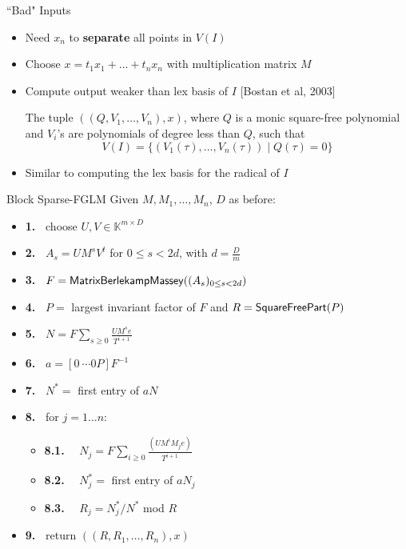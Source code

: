 \documentclass{beamer}
\begin{document}
\begin{frame}{``Bad" Inputs}
	\begin{itemize}
		\item Need $x_n$ to \textbf{separate} all points in $V(I)$
		\item Choose $x = t_1 x_1 + \dots + t_n x_n$ with multiplication matrix $M$
		\item Compute output weaker than lex basis of $I$ [Bostan et al, 2003]
		\begin{definition}
			The tuple $((Q,V_1,\dots,V_n),x)$, where $Q$ is a monic square-free
			polynomial and $V_i$'s are polynomials of degree less than $Q$, such
			that
			$$ V(I) = \{ (V_1(\tau), \dots, V_n(\tau)) \mid Q(\tau) = 0 \} $$
		\end{definition}
		\item Similar to computing the lex basis for the radical of $I$
	\end{itemize}

\end{frame}

\begin{frame}{Block Sparse-FGLM}
	Given $M,M_1,\dots,M_n$, $D$ as before:
		\begin{itemize}
			\item[]{\bf 1.~} {\sf choose $U,V \in \mathbb{K}^{m \times D}$}
			\item[]{\bf 2.~} {\sf $A_s = UM^sV^t$ for $0 \le s < 2d$, with $d = \frac{D}{m}$}
			\item[]{\bf 3.~} {\sf $F = {\sf MatrixBerlekampMassey}((A_s)_{0\le s < 2d})$}
			\item[]{\bf 4.~} {\sf $P=$ largest invariant factor of $F$ and $R={\sf SquareFreePart}(P)$}
			\item[]{\bf 5.~} {\sf $N = F\sum_{s\ge 0} \frac{UM^s e}{T^{i+1}}$}
			\item[]{\bf 6.~} {\sf $a = [0 ~\cdots 0 P] F^{-1}$}
			\item[]{\bf 7.~} {\sf $N^*=$ first entry of $aN$}
			\item[]{\bf 8.~} {\sf for $j = 1 \dots n$:}
			\begin{itemize}
				\item[]{\bf 8.1.} ~~{\sf $N_j = F\sum_{i\ge 0} \frac{(UM^i M_j e)}{T^{i+1}}$}
				\item[]{\bf 8.2.} ~~{\sf $N^*_j=$ first entry of $aN_j$}
				\item[]{\bf 8.3.} ~~{\sf $R_j=N^*_j/N^*$ mod $R$}
			\end{itemize}
			\item[]{\bf 9.~} {return $((R,R_1,\dots,R_n), x)$}
		\end{itemize}
\end{frame}
\end{document}
